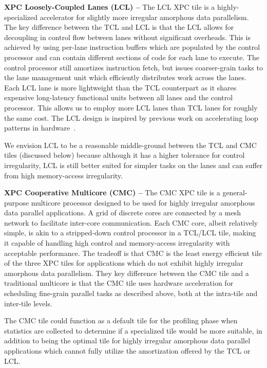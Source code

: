 \textbf{XPC Loosely-Coupled Lanes (LCL) --} The LCL XPC tile is a
highly-specialized accelerator for slightly more irregular amorphous data
parallelism. The key difference between the TCL and LCL is that the LCL
allows for decoupling in control flow between lanes without significant
overheads. This is achieved by using per-lane instruction buffers which are
populated by the control processor and can contain different sections of
code for each lane to execute. The control processor still amortizes
instruction fetch, but issues coarser-grain tasks to the lane management
unit which efficiently distributes work across the lanes. Each LCL lane
is more lightweight than the TCL counterpart as it shares expensive
long-latency functional units between all lanes and the control
processor. This allows us to employ more LCL lanes than TCL lanes for
roughly the same cost. The LCL design is inspired by previous work on
accelerating loop patterns in hardware~\cite{srinath-xloops-micro2014}.

We envision LCL to be a reasonable middle-ground between the TCL and CMC
tiles (discussed below) because although it has a higher tolerance for
control irregularity, LCL is still better suited for simpler tasks on the
lanes and can suffer from high memory-access irregularity.

\textbf{XPC Cooperative Multicore (CMC) --} The CMC XPC tile is a
general-purpose multicore processor designed to be used for highly
irregular amorphous data parallel applications. A grid of discrete cores
are connected by a mesh network to facilitate inter-core
communication. Each CMC core, albeit relatively simple, is akin to a
stripped-down control processor in a TCL/LCL tile, making it capable of
handling high control and memory-access irregularity with acceptable
performance. The tradeoff is that CMC is the least energy efficient tile
of the three XPC tiles for applications which do not exhibit highly
irregular amorphous data parallelism. They key difference between the CMC
tile and a traditional multicore is that the CMC tile uses hardware
acceleration for scheduling fine-grain parallel tasks as described above,
both at the intra-tile and inter-tile levels.

The CMC tile could function as a default tile for the profiling phase
when statistics are collected to determine if a specialized tile would be
more suitable, in addition to being the optimal tile for highly irregular
amorphous data parallel applications which cannot fully utilize the
amortization offered by the TCL or LCL.

